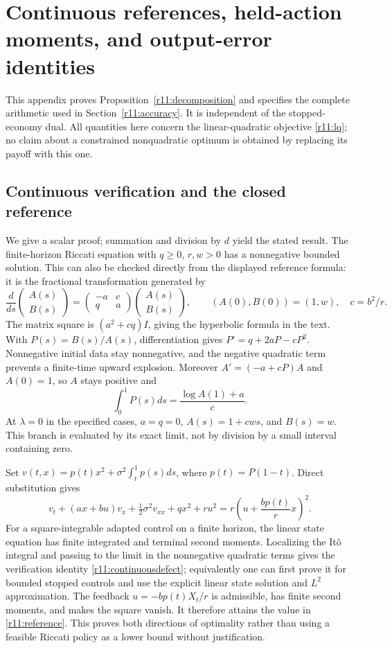 \section{Continuous references, held-action moments, and output-error identities}\label{r11:proof}
This appendix proves Proposition~\ref{r11:decomposition} and specifies the complete arithmetic used in Section~\ref{r11:accuracy}. It is independent of the stopped-economy dual. All quantities here concern the linear-quadratic objective \eqref{r11:lq}; no claim about a constrained nonquadratic optimum is obtained by replacing its payoff with this one.

\subsection{Continuous verification and the closed reference}
We give a scalar proof; summation and division by $d$ yield the stated result. The finite-horizon Riccati equation with $q\geq0$, $r,w>0$ has a nonnegative bounded solution. This can also be checked directly from the displayed reference formula: it is the fractional transformation generated by
\[
 \frac{d}{ds}\begin{pmatrix}A(s)\\B(s)\end{pmatrix}
 =\begin{pmatrix}-a&c\\q&a\end{pmatrix}\begin{pmatrix}A(s)\\B(s)\end{pmatrix},
 \qquad (A(0),B(0))=(1,w),\quad c=b^2/r.
\]
The matrix square is $(a^2+cq)I$, giving the hyperbolic formula in the text. With $P(s)=B(s)/A(s)$, differentiation gives $P'=q+2aP-cP^2$. Nonnegative initial data stay nonnegative, and the negative quadratic term prevents a finite-time upward explosion. Moreover $A'=(-a+cP)A$ and $A(0)=1$, so $A$ stays positive and
\[
 \int_0^1P(s)ds=\frac{\log A(1)+a}{c}.
\]
At $\lambda=0$ in the specified cases, $a=q=0$, $A(s)=1+cws$, and $B(s)=w$. This branch is evaluated by its exact limit, not by division by a small interval containing zero.

Set $v(t,x)=p(t)x^2+\sigma^2\int_t^1p(s)ds$, where $p(t)=P(1-t)$. Direct substitution gives
\[
 v_t+(ax+bu)v_x+\tfrac12\sigma^2v_{xx}+qx^2+ru^2
 =r\left(u+\frac{bp(t)}r x\right)^2.
\]
For a square-integrable adapted control on a finite horizon, the linear state equation has finite integrated and terminal second moments. Localizing the It\^o integral and passing to the limit in the nonnegative quadratic terms gives the verification identity \eqref{r11:continuousdefect}; equivalently one can first prove it for bounded stopped controls and use the explicit linear state solution and $L^2$ approximation. The feedback $u=-bp(t)X_t/r$ is admissible, has finite second moments, and makes the square vanish. It therefore attains the value in \eqref{r11:reference}. This proves both directions of optimality rather than using a feasible Riccati policy as a lower bound without justification.

